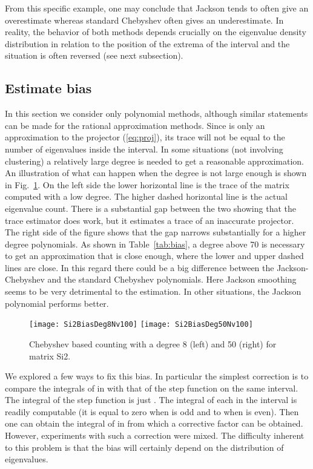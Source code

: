 \documentclass[12pt]{article}		\usepackage{tabls,multirow}
\def\nref#1{(\ref{#1})}
\begin{document}
From this specific example, one may conclude that Jackson tends to
often give an overestimate whereas standard Chebyshev often gives an
underestimate. In reality, the behavior of both methods depends
crucially on the eigenvalue density distribution in relation to the
position of the extrema of the interval  and the situation is
often reversed (see next subsection).

\subsection{Estimate bias}\label{sec:bias}  
In this section we consider only polynomial methods, although similar
statements can be made for the rational approximation methods.  Since
 is only an approximation to the projector \nref{eq:proj},
its trace will not be equal to the number of eigenvalues inside the
interval. In some situations (not involving clustering) a relatively
large degree is needed to get a reasonable approximation. An
illustration of what can happen when the degree is not large enough is
shown in Fig.~\ref{fig:Si2Bias}.  On the left side the lower
horizontal line is the trace of the matrix  computed with a
low degree. The higher dashed horizontal line is the actual eigenvalue
count. There is a substantial gap between the two showing that the trace
estimator does work, but it estimates a trace of an inaccurate
projector. The right side of the figure shows that the gap narrows
substantially for a higher degree polynomials. As shown in
Table~\ref{tab:bias}, a degree above 70 is necessary to get an
approximation that is close enough, where the lower and upper dashed
lines are close. In this regard there could be a big difference
between the Jackson-Chebyshev and the standard Chebyshev
polynomials. Here Jackson smoothing seems to be very detrimental to
the estimation. In other situations, the Jackson polynomial performs
better.

\begin{figure}[hbt]
\begin{center} 
\texttt{[image: Si2BiasDeg8Nv100]} 
\texttt{[image: Si2BiasDeg50Nv100]} 
\end{center} 
\caption{Chebyshev based counting with a degree 8 (left) and
50 (right) for matrix Si2.
\label{fig:Si2Bias}}
\end{figure}
  
We explored a few ways to fix this bias. In particular the simplest
correction is to compare the integrals of  in 
with that of the step function on the same interval. The integral of
the step function is just .  The integral of each  in the
interval  is readily computable (it is equal to zero when
 is odd and to  when  is even).  Then one can
obtain the integral of  in  from which a corrective
factor can be obtained. However, experiments with such a correction
were mixed. The difficulty inherent to this problem is that the bias will
certainly depend on the distribution of eigenvalues.
\end{document}
